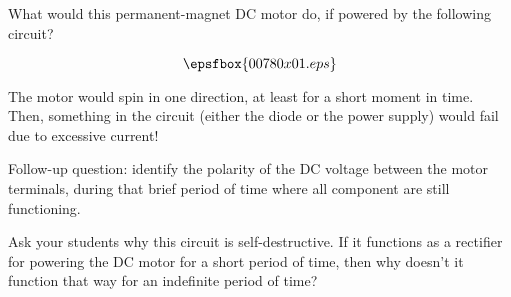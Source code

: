 

What would this permanent-magnet DC motor do, if powered by the following circuit?

$$\epsfbox{00780x01.eps}$$







The motor would spin in one direction, at least for a short moment in time.  Then, something in the circuit (either the diode or the power supply) would fail due to excessive current!

\vskip 10pt

Follow-up question: identify the polarity of the DC voltage between the motor terminals, during that brief period of time where all component are still functioning.







Ask your students why this circuit is self-destructive.  If it functions as a rectifier for powering the DC motor for a short period of time, then why doesn't it function that way for an indefinite period of time?




